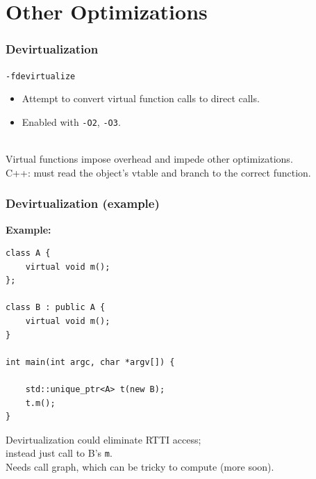 \section{Other Optimizations}
\begin{frame}
  \frametitle{Devirtualization}

  
  {\tt -fdevirtualize}

  \begin{itemize}
    \item Attempt to convert virtual function calls to direct calls.
    \item Enabled with {\tt -O2}, {\tt -O3}.
  \end{itemize}
~\\[1em]

  Virtual functions impose overhead and impede other optimizations.\\[1em]
  C++: must read
  the object's vtable and branch to
  the correct function.
  
\end{frame}

\begin{frame}[fragile]
  \frametitle{Devirtualization (example)}
  

  {\bf Example:}

  \begin{lstlisting}
class A {
    virtual void m();
};

class B : public A {
    virtual void m();
}

int main(int argc, char *argv[]) {

    std::unique_ptr<A> t(new B);
    t.m();
}
  \end{lstlisting}
  Devirtualization could eliminate RTTI access; \\ \qquad instead just call to B's {\tt m}.\\
  Needs call graph, which can be tricky to compute (more soon).
  
\end{frame}

